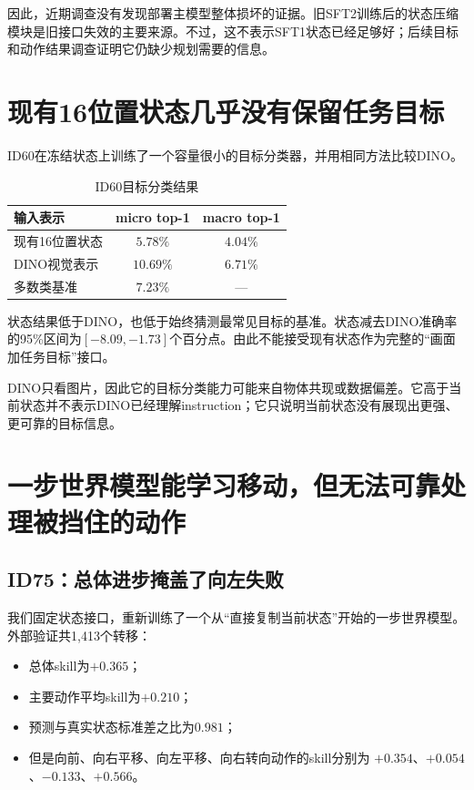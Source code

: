 \documentclass[UTF8,11pt,a4paper,fontset=none]{ctexart}
\begin{document}
因此，近期调查没有发现部署主模型整体损坏的证据。旧SFT2训练后的状态压缩模块是旧接口失效的主要来源。不过，这不表示SFT1状态已经足够好；后续目标和动作结果调查证明它仍缺少规划需要的信息。

\section{现有16位置状态几乎没有保留任务目标}

ID60在冻结状态上训练了一个容量很小的目标分类器，并用相同方法比较DINO。

\begin{table}[htbp]
\centering
\caption{ID60目标分类结果}
\small
\begin{tabular}{lcc}
\toprule
\textbf{输入表示} & \textbf{micro top-1} & \textbf{macro top-1} \\
\midrule
现有16位置状态 & $5.78\%$ & $4.04\%$ \\
DINO视觉表示 & $10.69\%$ & $6.71\%$ \\
多数类基准 & $7.23\%$ & --- \\
\bottomrule
\end{tabular}
\end{table}

状态结果低于DINO，也低于始终猜测最常见目标的基准。状态减去DINO准确率的95\%区间为$[-8.09,-1.73]$个百分点。由此不能接受现有状态作为完整的“画面加任务目标”接口。

DINO只看图片，因此它的目标分类能力可能来自物体共现或数据偏差。它高于当前状态并不表示DINO已经理解instruction；它只说明当前状态没有展现出更强、更可靠的目标信息。

\section{一步世界模型能学习移动，但无法可靠处理被挡住的动作}

\subsection{ID75：总体进步掩盖了向左失败}

我们固定状态接口，重新训练了一个从“直接复制当前状态”开始的一步世界模型。外部验证共1,413个转移：

\begin{itemize}
  \item 总体skill为$+0.365$；
  \item 主要动作平均skill为$+0.210$；
  \item 预测与真实状态标准差之比为$0.981$；
  \item 但是向前、向右平移、向左平移、向右转向动作的skill分别为
  $+0.354$、$+0.054$、$-0.133$、$+0.566$。
\end{itemize}
\end{document}

